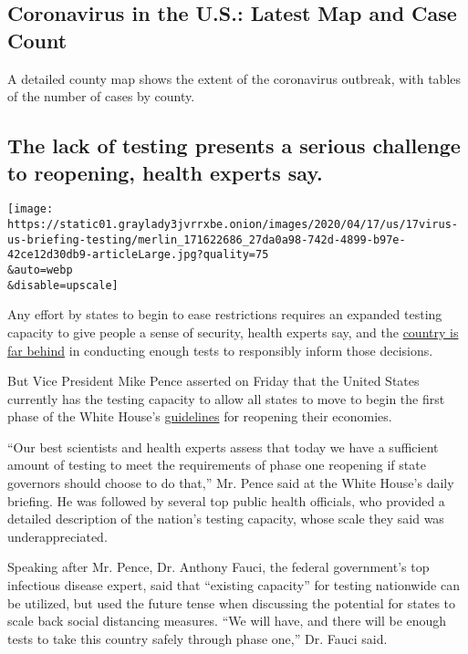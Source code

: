 \hypertarget{coronavirus-in-the-us-latest-map-and-case-count}{%
\subsection{Coronavirus in the U.S.: Latest Map and Case
Count}\label{coronavirus-in-the-us-latest-map-and-case-count}}

A detailed county map shows the extent of the coronavirus outbreak, with
tables of the number of cases by county.

\hypertarget{the-lack-of-testing-presents-a-serious-challenge-to-reopening-health-experts-say}{%
\subsection{The lack of testing presents a serious challenge to
reopening, health experts
say.}\label{the-lack-of-testing-presents-a-serious-challenge-to-reopening-health-experts-say}}

\texttt{[image: https://static01.graylady3jvrrxbe.onion/images/2020/04/17/us/17virus-us-briefing-testing/merlin\_171622686\_27da0a98-742d-4899-b97e-42ce12d30db9-articleLarge.jpg?quality=75\\\&auto=webp\\\&disable=upscale]}

Any effort by states to begin to ease restrictions requires an expanded
testing capacity to give people a sense of security, health experts say,
and the
\href{https://www.nytimes3xbfgragh.onion/2020/04/15/us/coronavirus-testing-trump.html}{country
is far behind} in conducting enough tests to responsibly inform those
decisions.

But Vice President Mike Pence asserted on Friday that the United States
currently has the testing capacity to allow all states to move to begin
the first phase of the White House's
\href{https://www.whitehouse.gov/openingamerica/}{guidelines} for
reopening their economies.

``Our best scientists and health experts assess that today we have a
sufficient amount of testing to meet the requirements of phase one
reopening if state governors should choose to do that,'' Mr. Pence said
at the White House's daily briefing. He was followed by several top
public health officials, who provided a detailed description of the
nation's testing capacity, whose scale they said was underappreciated.

Speaking after Mr. Pence, Dr. Anthony Fauci, the federal government's
top infectious disease expert, said that ``existing capacity'' for
testing nationwide can be utilized, but used the future tense when
discussing the potential for states to scale back social distancing
measures. ``We will have, and there will be enough tests to take this
country safely through phase one,'' Dr. Fauci said.

